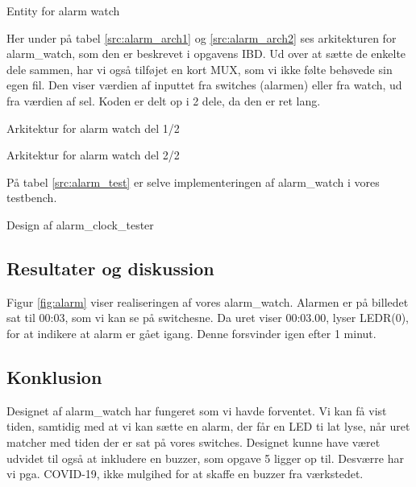 \documentclass[../journal.tex]{subfiles}
\begin{document}
\begin{table}[H]
    \centering
      \framebox{
        \rule{8pt}{0pt}
          
  }
  \caption{Entity for alarm watch}	
  \label{src:alarm_ent}
\end{table}

Her under på tabel \ref{src:alarm_arch1} og \ref{src:alarm_arch2} ses arkitekturen for alarm\_watch, som den er beskrevet i opgavens IBD. Ud over at sætte de enkelte dele sammen, har vi også tilføjet en kort MUX, som vi ikke følte behøvede sin egen fil. Den viser værdien af inputtet fra switches (alarmen) eller fra watch, ud fra værdien af sel. Koden er delt op i 2 dele, da den er ret lang.

\begin{table}[H]
    \centering
      \framebox{
        \rule{8pt}{0pt}
          
  }
  \caption{Arkitektur for alarm watch del 1/2}	
  \label{src:alarm_arch1}
\end{table}

\begin{table}[H]
    \centering
      \framebox{
        \rule{8pt}{0pt}
          
  }
  \caption{Arkitektur for alarm watch del 2/2}	
  \label{src:alarm_arch2}
\end{table}

På tabel \ref{src:alarm_test} er selve implementeringen af alarm\_watch i vores testbench.

\begin{table}[H]
    \centering
      \framebox{
        \rule{8pt}{0pt}
          
  }
  \caption{Design af alarm\_clock\_tester}	
  \label{src:alarm_test}
\end{table}

\subsection{Resultater og diskussion}

Figur \ref{fig:alarm} viser realiseringen af vores alarm\_watch. Alarmen er på billedet sat til 00:03, som vi kan se på switchesne. Da uret viser 00:03.00, lyser LEDR(0), for at indikere at alarm er gået igang. Denne forsvinder igen efter 1 minut.


\subsection{Konklusion}

Designet af alarm\_watch har fungeret som vi havde forventet. Vi kan få vist tiden, samtidig med at vi kan sætte en alarm, der får en LED ti lat lyse, når uret matcher med tiden der er sat på vores switches. Designet kunne have været udvidet til også at inkludere en buzzer, som opgave 5 ligger op til. Desværre har vi pga. COVID-19, ikke mulgihed for at skaffe en buzzer fra værkstedet.
\end{document}
